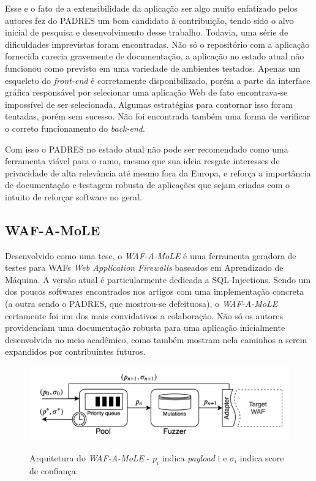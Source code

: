 Esse e o fato de a extensibilidade da aplicação ser algo muito enfatizado pelos autores fez do PADRES um bom candidato à contribuição, tendo sido o alvo inicial de pesquisa e desenvolvimento desse trabalho. Todavia, uma série de dificuldades imprevistas foram encontradas. Não só o repositório com a aplicação fornecida carecia gravemente de documentação, a aplicação no estado atual não funcionou como previsto em uma variedade de ambientes testados. Apenas um esqueleto do \textit{front-end} é corretamente disponibilizado, porém a parte da interface gráfica responsável por selecionar uma aplicação Web de fato encontrava-se impossível de ser selecionada. Algumas estratégias para contornar isso foram tentadas, porém sem sucesso. Não foi encontrada também uma forma de verificar o correto funcionamento do \textit{back-end}.

Com isso o PADRES no estado atual não pode ser recomendado como uma ferramenta viável para o ramo, mesmo que sua ideia resgate interesses de privacidade de alta relevância até mesmo fora da Europa, e reforça a importância de documentação e testagem robusta de aplicações que sejam criadas com o intuito de reforçar software no geral.

\subsection{WAF-A-MoLE}

Desenvolvido como uma tese, o \textit{WAF-A-MoLE} \cite{valenza_waf--mole_2020} é uma ferramenta geradora de testes para WAFs \textit{Web Application Firewalls} baseados em Aprendizado de Máquina. A versão atual é particularmente dedicada a SQL-Injections. Sendo um dos poucos softwares encontrados nos artigos com uma implementação concreta (a outra sendo o PADRES, que mostrou-se defeituosa), o \textit{WAF-A-MoLE} certamente foi um dos mais convidativos a colaboração. Não só os autores providenciam uma documentação robusta para uma aplicação inicialmente desenvolvida no meio acadêmico, como também mostram nela caminhos a serem expandidos por contribuintes futuros.

\begin{figure}[ht]
    \centering
    \caption{Arquitetura do \textit{WAF-A-MoLE} - $p_i$ indica \textit{payload} i e $\sigma_i$  indica score de confiança.}
    \includegraphics[width=14cm]{figuras/wafamoleArchitecture.png} 
    \label{fig:internet} 
\end{figure}


